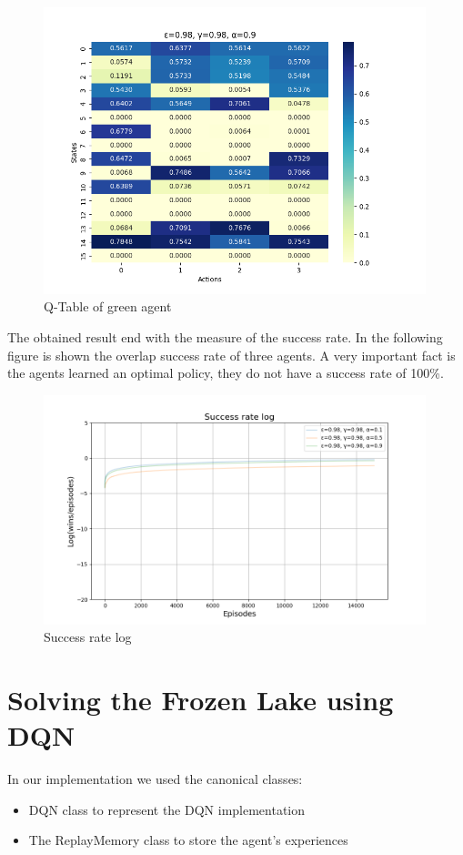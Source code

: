 \begin{figure}[H]
    \centering
    \includegraphics[width=0.99\textwidth]{images/heatmap_nd3.png}
    \caption{Q-Table of green agent}
    \label{fig:green_agent_nd}
\end{figure}
The obtained result end with the measure of the success rate.
In the following figure is shown the overlap success rate of three agents.
A very important fact is the agents learned an optimal policy, they do not have a success rate of 100\%.
\begin{figure}[H]
    \centering
    \includegraphics[width=0.99\textwidth]{images/success_rate_log_nd.png}
    \caption{Success rate log}
    \label{fig:success_rate_log_nd}
\end{figure}
\section{Solving the Frozen Lake using DQN}
In our implementation we used the canonical classes:
\begin{itemize}
    \item DQN class to represent the DQN implementation
    \item The ReplayMemory class to store the agent's experiences
\end{itemize}

